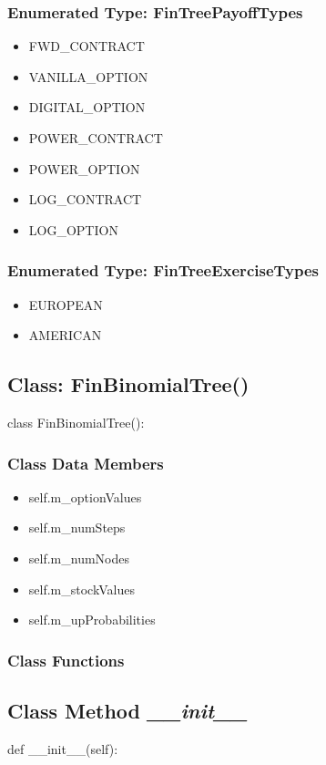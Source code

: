 \documentclass[twoside,11pt]{book}
\begin{document}
\subsubsection{Enumerated Type: FinTreePayoffTypes}
\begin{itemize}
\item{FWD\_CONTRACT}
\item{VANILLA\_OPTION}
\item{DIGITAL\_OPTION}
\item{POWER\_CONTRACT}
\item{POWER\_OPTION}
\item{LOG\_CONTRACT}
\item{LOG\_OPTION}
\end{itemize}

\subsubsection{Enumerated Type: FinTreeExerciseTypes}
\begin{itemize}
\item{EUROPEAN}
\item{AMERICAN}
\end{itemize}

\subsection{Class: FinBinomialTree()}
class FinBinomialTree():

\subsubsection{Class Data Members}
\begin{itemize}
\item{self.m\_optionValues}
\item{self.m\_numSteps}
\item{self.m\_numNodes}
\item{self.m\_stockValues}
\item{self.m\_upProbabilities}
\end{itemize}

\subsubsection{Class Functions}

\subsection{Class Method {\it \_\_init\_\_}}
def \_\_init\_\_(self):
\end{document}
